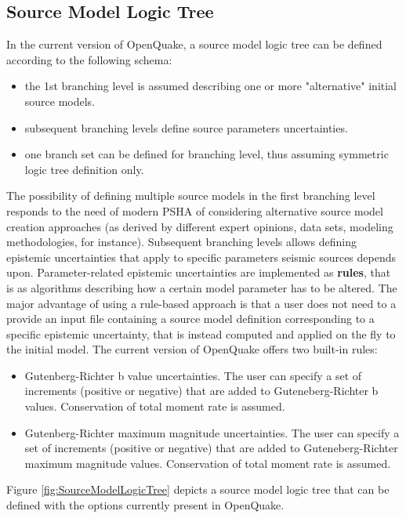 \subsection{Source Model Logic Tree}
\label{hazard:source_model_logic_tree}
In the current version of OpenQuake, a source model logic tree can be defined according to the following schema:
\begin{itemize}
\item the 1st branching level is assumed describing one or more "alternative" initial source models.
\item subsequent branching levels define source parameters uncertainties.
\item one branch set can be defined for branching level, thus assuming symmetric logic tree definition only.
\end{itemize}
The possibility of defining multiple source models in the first branching level responds to the need of modern PSHA of considering alternative source model creation approaches (as derived by different expert opinions, data sets, modeling methodologies, for instance). Subsequent branching levels allows defining epistemic uncertainties that apply to specific parameters seismic sources depends upon. Parameter-related epistemic uncertainties are implemented as \textbf{rules}, that is as algorithms describing how a certain model parameter has to be altered. The major advantage of using a rule-based approach is that a user does not need to a provide an input file containing a source model definition corresponding to a specific epistemic uncertainty, that is instead computed and applied on the fly to the initial model. The current version of OpenQuake offers two built-in rules:
\begin{itemize}
\item Gutenberg-Richter b value uncertainties. The user can specify a set of increments (positive or negative) that are added to Guteneberg-Richter b values. Conservation of total moment rate is assumed.
\item Gutenberg-Richter maximum magnitude uncertainties. The user can specify a set of increments (positive or negative) that are added to Guteneberg-Richter maximum magnitude values. Conservation of total moment rate is assumed.
\end{itemize}
Figure \ref{fig:SourceModelLogicTree} depicts a source model logic tree that can be defined with the options currently present in OpenQuake. 
